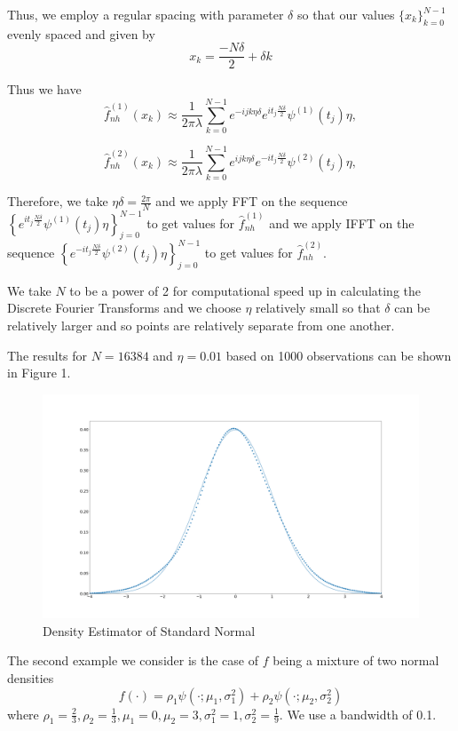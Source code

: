 \documentclass[a4paper,11pt]{article}
\theoremstyle{theorem}
\theoremstyle{definition}
\begin{document}
Thus, we employ a regular spacing with parameter $\delta$ so that our values $\{x_{k}\}_{k=0}^{N-1}$ evenly spaced and given by
\[
x_{k} = \frac{-N\delta}{2} + \delta k
\]

Thus we have
\begin{equation}
\hat{f}_{nh}^{(1)}(x_{k}) \approx \frac{1}{2\pi\lambda}\sum_{k=0}^{N-1}{e^{-ijk\eta\delta}e^{it_{j}\frac{N\delta}{2}}\psi^{(1)}(t_{j})\eta},
\end{equation}

\begin{equation}
\hat{f}_{nh}^{(2)}(x_{k}) \approx \frac{1}{2\pi\lambda}\sum_{k=0}^{N-1}{e^{ijk\eta\delta}e^{-it_{j}\frac{N\delta}{2}}\psi^{(2)}(t_{j})\eta},
\end{equation}

Therefore, we take $\eta\delta = \frac{2\pi}{N}$ and we apply FFT on the sequence $\left\lbrace e^{it_{j}\frac{N\delta}{2}}\psi^{(1)}(t_{j})\eta \right\rbrace_{j=0}^{N-1}$ to get values for $\hat{f}_{nh}^{(1)}$ and we apply IFFT on the sequence $\left\lbrace e^{-it_{j}\frac{N\delta}{2}}\psi^{(2)}(t_{j})\eta \right\rbrace_{j=0}^{N-1}$ to get values for $\hat{f}_{nh}^{(2)}$.

We take $N$ to be a power of 2 for computational speed up in calculating the Discrete Fourier Transforms and we choose $\eta$ relatively small so that $\delta$ can be relatively larger and so points are relatively separate from one another.

The results for $N = 16384$ and $\eta = 0.01$ based on 1000 observations can be shown in Figure 1.

\begin{figure}[h]
\centering
\includegraphics[scale=0.15]{fft_standard_normal.png}
\caption{Density Estimator of Standard Normal}
\label{stdNormal}
\end{figure} 

The second example we consider is the case of $f$ being a mixture of two normal densities
\[
f(\cdot) = \rho_{1}\psi(\cdot;\mu_{1},\sigma_{1}^{2}) + \rho_{2}\psi(\cdot;\mu_{2}, \sigma_{2}^{2}) 
\] 
where $\rho_{1} = \frac{2}{3}, \rho_{2} = \frac{1}{3}, \mu_{1} = 0, \mu_{2} = 3, \sigma_{1}^{2} = 1, \sigma_{2}^{2} = \frac{1}{9}$. We use a bandwidth of 0.1.
\end{document}
